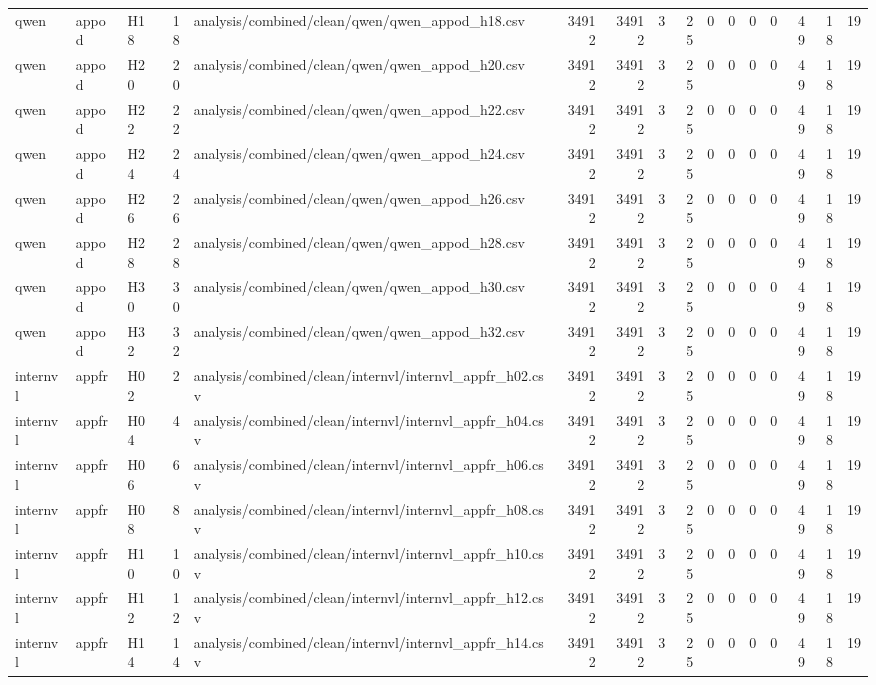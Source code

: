 \begin{longtable}{lllrlrrrrrrrrrrr}
qwen & appod & H18 & 18 & analysis/combined/clean/qwen/qwen\_appod\_h18.csv & 34912 & 34912 & 3 & 25 & 0 & 0 & 0 & 0 & 49 & 18 & 19 \\
qwen & appod & H20 & 20 & analysis/combined/clean/qwen/qwen\_appod\_h20.csv & 34912 & 34912 & 3 & 25 & 0 & 0 & 0 & 0 & 49 & 18 & 19 \\
qwen & appod & H22 & 22 & analysis/combined/clean/qwen/qwen\_appod\_h22.csv & 34912 & 34912 & 3 & 25 & 0 & 0 & 0 & 0 & 49 & 18 & 19 \\
qwen & appod & H24 & 24 & analysis/combined/clean/qwen/qwen\_appod\_h24.csv & 34912 & 34912 & 3 & 25 & 0 & 0 & 0 & 0 & 49 & 18 & 19 \\
qwen & appod & H26 & 26 & analysis/combined/clean/qwen/qwen\_appod\_h26.csv & 34912 & 34912 & 3 & 25 & 0 & 0 & 0 & 0 & 49 & 18 & 19 \\
qwen & appod & H28 & 28 & analysis/combined/clean/qwen/qwen\_appod\_h28.csv & 34912 & 34912 & 3 & 25 & 0 & 0 & 0 & 0 & 49 & 18 & 19 \\
qwen & appod & H30 & 30 & analysis/combined/clean/qwen/qwen\_appod\_h30.csv & 34912 & 34912 & 3 & 25 & 0 & 0 & 0 & 0 & 49 & 18 & 19 \\
qwen & appod & H32 & 32 & analysis/combined/clean/qwen/qwen\_appod\_h32.csv & 34912 & 34912 & 3 & 25 & 0 & 0 & 0 & 0 & 49 & 18 & 19 \\
internvl & appfr & H02 & 2 & analysis/combined/clean/internvl/internvl\_appfr\_h02.csv & 34912 & 34912 & 3 & 25 & 0 & 0 & 0 & 0 & 49 & 18 & 19 \\
internvl & appfr & H04 & 4 & analysis/combined/clean/internvl/internvl\_appfr\_h04.csv & 34912 & 34912 & 3 & 25 & 0 & 0 & 0 & 0 & 49 & 18 & 19 \\
internvl & appfr & H06 & 6 & analysis/combined/clean/internvl/internvl\_appfr\_h06.csv & 34912 & 34912 & 3 & 25 & 0 & 0 & 0 & 0 & 49 & 18 & 19 \\
internvl & appfr & H08 & 8 & analysis/combined/clean/internvl/internvl\_appfr\_h08.csv & 34912 & 34912 & 3 & 25 & 0 & 0 & 0 & 0 & 49 & 18 & 19 \\
internvl & appfr & H10 & 10 & analysis/combined/clean/internvl/internvl\_appfr\_h10.csv & 34912 & 34912 & 3 & 25 & 0 & 0 & 0 & 0 & 49 & 18 & 19 \\
internvl & appfr & H12 & 12 & analysis/combined/clean/internvl/internvl\_appfr\_h12.csv & 34912 & 34912 & 3 & 25 & 0 & 0 & 0 & 0 & 49 & 18 & 19 \\
internvl & appfr & H14 & 14 & analysis/combined/clean/internvl/internvl\_appfr\_h14.csv & 34912 & 34912 & 3 & 25 & 0 & 0 & 0 & 0 & 49 & 18 & 19 \\

\end{longtable}
